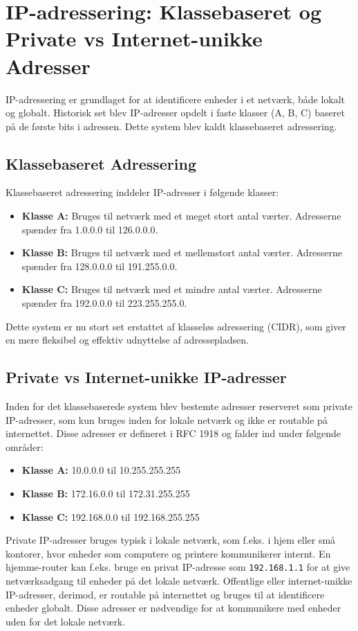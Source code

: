 \section{IP-adressering: Klassebaseret og Private vs Internet-unikke Adresser}
IP-adressering er grundlaget for at identificere enheder i et netværk, både lokalt og globalt. Historisk set blev IP-adresser opdelt i faste klasser (A, B, C) baseret på de første bits i adressen. Dette system blev kaldt klassebaseret adressering.

\subsection{Klassebaseret Adressering}
Klassebaseret adressering inddeler IP-adresser i følgende klasser:

\begin{itemize}
	\item \textbf{Klasse A:} Bruges til netværk med et meget stort antal værter. Adresserne spænder fra 1.0.0.0 til 126.0.0.0.
	\item \textbf{Klasse B:} Bruges til netværk med et mellemstort antal værter. Adresserne spænder fra 128.0.0.0 til 191.255.0.0.
	\item \textbf{Klasse C:} Bruges til netværk med et mindre antal værter. Adresserne spænder fra 192.0.0.0 til 223.255.255.0.
\end{itemize}
Dette system er nu stort set erstattet af klasseløs adressering (CIDR), som giver en mere fleksibel og effektiv udnyttelse af adressepladsen.

\subsection{Private vs Internet-unikke IP-adresser}
Inden for det klassebaserede system blev bestemte adresser reserveret som private IP-adresser, som kun bruges inden for lokale netværk og ikke er routable på internettet. Disse adresser er defineret i RFC 1918 og falder ind under følgende områder:
\begin{itemize}
	\item \textbf{Klasse A:} 10.0.0.0 til 10.255.255.255
	\item \textbf{Klasse B:} 172.16.0.0 til 172.31.255.255
	\item \textbf{Klasse C:} 192.168.0.0 til 192.168.255.255
\end{itemize}
\noindent Private IP-adresser bruges typisk i lokale netværk, som f.eks. i hjem eller små kontorer, hvor enheder som computere og printere kommunikerer internt. En hjemme-router kan f.eks. bruge en privat IP-adresse som \texttt{192.168.1.1} for at give netværksadgang til enheder på det lokale netværk.
\newline\newline\noindent
Offentlige eller internet-unikke IP-adresser, derimod, er routable på internettet og bruges til at identificere enheder globalt. Disse adresser er nødvendige for at kommunikere med enheder uden for det lokale netværk.

